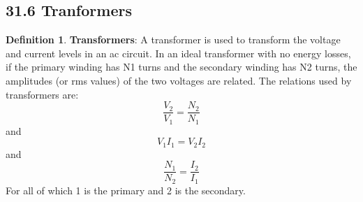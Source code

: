 \documentclass[12pt]{amsart}
\theoremstyle{definition}
\newtheorem{definition}{Definition} %
\numberwithin{equation}{theorem}    %
\begin{document}
\subsection*{31.6 Tranformers}

    \begin{definition}
        \textbf{Transformers}:
        A transformer is used to transform the voltage and current levels in an ac circuit. In an ideal transformer with no energy losses, if the primary winding has N1 turns and the secondary winding has N2 turns, the amplitudes (or rms values) of the two voltages are related.
        The relations used by transformers are:
        $$\frac{V_2}{V_1} = \frac{N_2}{N_1}$$
        and
        $$V_1I_1 = V_2I_2$$
        and
        $$\frac{N_1}{N_2} = \frac{I_2}{I_1}$$
        For all of which 1 is the primary and 2 is the secondary.
    \end{definition}
\end{document}
